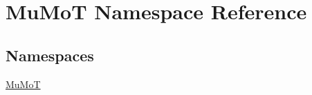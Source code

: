 \hypertarget{namespace_mu_mo_t}{}\section{Mu\+MoT Namespace Reference}
\label{namespace_mu_mo_t}
\subsection*{Namespaces}
\begin{DoxyCompactItemize}
\item 
 \hyperlink{namespace_mu_mo_t_1_1_mu_mo_t}{Mu\+MoT}
\end{DoxyCompactItemize}
